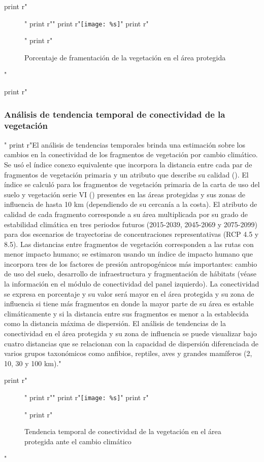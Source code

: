 \documentclass{article}
\begin{document}
\begin{python}
{		   print r"\begin{figure}[H]"
		   print r"\centering"
		   print r"\texttt{[image: \%s]}" %
		   print r"\caption{Porcentaje de framentaci\'on de la vegetaci\'on en el \'area protegida}"
		   print r"\end{figure}"

		   print r"\subsubsection{An\'alisis de tendencia temporal de conectividad de la vegetaci\'on}"
		   print r"El an\'alisis de tendencias temporales brinda una estimaci\'on sobre los cambios en la conectividad de los fragmentos de vegetaci\'on por cambio clim\'atico. Se us\'o el \'indice conexo equivalente que incorpora la distancia entre cada par de fragmentos de vegetaci\'on primaria y un atributo que describe su calidad (\cite{Saura11, Saura17}). El \'indice se calcul\'o para los fragmentos de vegetaci\'on primaria de la carta de uso del suelo y vegetaci\'on serie VI (\cite{Inegi2013, Inegi2016}) presentes en las \'areas protegidas y sus zonas de influencia de hasta 10 km (dependiendo de su cercanía a la costa). El atributo de calidad de cada fragmento corresponde a su \'area multiplicada por su grado de estabilidad clim\'atica en tres periodos futuros (2015-2039, 2045-2069 y 2075-2099) para dos escenarios de trayectorias de concentraciones representativas (RCP 4.5 y 8.5). Las distancias entre fragmentos de vegetaci\'on corresponden a las rutas con menor impacto humano; se estimaron usando un \'indice de impacto humano que incorpora tres de los factores de presi\'on antropog\'enicos m\'as importantes: cambio de uso del suelo, desarrollo de infraestructura y fragmentaci\'on de h\'abitats (v\'ease la informaci\'on en el m\'odulo de conectividad del panel izquierdo). La conectividad se expresa en porcentaje y su valor ser\'a mayor en el \'area protegida y su zona de influencia si tiene m\'as fragmentos en donde la mayor parte de su \'area es estable clim\'aticamente y si la distancia entre sus fragmentos es menor a la establecida como la distancia m\'axima de dispersi\'on. El an\'alisis de tendencias de la conectividad en el \'area protegida y su zona de influencia se puede visualizar bajo cuatro distancias que se relacionan con la capacidad de dispersi\'on diferenciada de varios grupos taxon\'omicos como anfibios, reptiles, aves y grandes mam\'iferos (2, 10, 30 y 100 km)."

		   print r"\begin{figure}[H]"
		   print r"\centering"
		   print r"\texttt{[image: \%s]}" %
		   print r"\caption{Tendencia temporal de conectividad de la vegetaci\'on en el \'area protegida ante el cambio clim\'atico}"
		   print r"\end{figure}"

}
\end{python}
\end{document}
